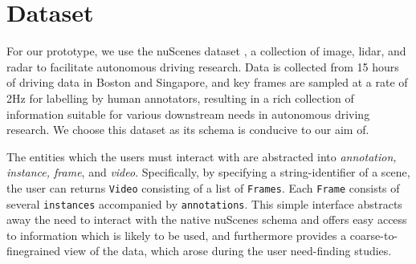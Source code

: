 
\section{Dataset}

For our prototype, we use the nuScenes dataset \cite{}, a collection of image, lidar, and radar to facilitate autonomous driving research. Data is collected from 15 hours of driving data in Boston and Singapore, and key frames are sampled at a rate of 2Hz for labelling by human annotators, resulting in a rich collection of information suitable for various downstream needs in autonomous driving research. We choose this dataset as its schema is conducive to our aim of.

The entities which the users must interact with are abstracted into \textit{annotation, instance, frame}, and \textit{video}. Specifically, by specifying a string-identifier of a scene, the user can returns \texttt{Video} consisting of a list of \texttt{Frames}. Each \texttt{Frame} consists of several \texttt{instances} accompanied by \texttt{annotations}. This simple interface abstracts away the need to interact with the native nuScenes schema and offers easy access to information which is likely to be used, and furthermore provides a coarse-to-finegrained view of the data, which arose during the user need-finding studies.